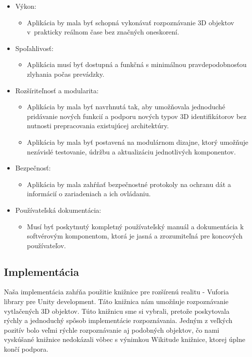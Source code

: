 \begin{itemize}
    \item Výkon:
    \begin{itemize}
        \item Aplikácia by mala byť schopná vykonávať rozpoznávanie 3D objektov v~prakticky reálnom čase bez značných oneskorení.
    \end{itemize}
    \item Spoľahlivosť:
    \begin{itemize}
        \item Aplikácia musí byť dostupná a funkčná s minimálnou pravdepodobnosťou zlyhania počas prevádzky.
    \end{itemize}
    \item Rozšíriteľnosť a modularita:
    \begin{itemize}
        \item Aplikácia by mala byť navrhnutá tak, aby umožňovala jednoduché pridávanie nových funkcií a podporu nových typov 3D identifikátorov bez nutnosti prepracovania existujúcej architektúry.
        \item Aplikácia by mala byť postavená na modulárnom dizajne, ktorý umožňuje nezávislé testovanie, údržbu a aktualizáciu jednotlivých komponentov.
    \end{itemize}
    \item Bezpečnosť:
    \begin{itemize}
        \item Aplikácia by mala zahŕňať bezpečnostné protokoly na ochranu dát a informácií o zariadeniach a ich ovládaniu.
    \end{itemize}
    \item Používateľská dokumentácia:
    \begin{itemize}
        \item Musí byť poskytnutý kompletný používateľský manuál a dokumentácia k softvérovým komponentom, ktorá je jasná a zrozumiteľná pre koncových používateľov.
    \end{itemize}
\end{itemize}

\subsection{Implementácia}

Naša implementácia zahŕňa použitie knižnice pre rozšírenú realitu - Vuforia library pre Unity development. Táto knižnica nám umožňuje rozpoznávanie vytlačených 3D objektov. Túto knižnicu sme si vybrali, pretože poskytovala rýchly a jednoduchý spôsob implementácie rozpoznávania. Jedným z veľkých pozitív bolo veľmi rýchle rozpoznávanie aj podobných objektov, čo nami vyskúšané knižnice nedokázali vôbec s výnimkou Wikitude knižnice, ktorej úplne končí podpora.  

